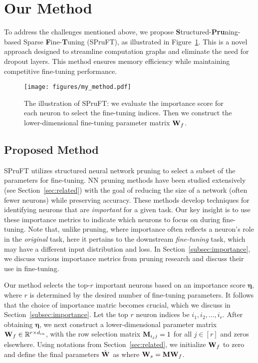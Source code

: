 \section{Our Method}\label{sec:method}

To address the challenges mentioned above, we propose \textbf{S}tructured-\textbf{Pru}ning-based Sparse \textbf{F}ine-\textbf{T}uning (SPruFT), as illustrated in Figure~\ref{fig:method}. This is a novel approach designed to streamline computation graphs and eliminate the need for dropout layers. This method ensures memory efficiency while maintaining competitive fine-tuning performance. 

\begin{figure}[htbp]
\begin{center}
\texttt{[image: figures/my\_method.pdf]}
\caption{The illustration of SPruFT: we evaluate the importance score for each neuron to select the fine-tuning indices. Then we construct the lower-dimensional fine-tuning parameter matrix ${\mathbf{W}}_f$.}\label{fig:method} %
\end{center}
\end{figure}
\unskip

\subsection{Proposed Method} \label{subsec:method}

SPruFT utilizes structured neural network pruning to select a subset of the parameters for fine-tuning. NN pruning methods have been studied extensively (see Section~\ref{sec:related}) with the goal of reducing the size of a network (often fewer neurons) while preserving accuracy. These methods develop techniques for identifying neurons that are \emph{important} for a given task. Our key insight is to use these importance metrics to indicate which neurons to focus on during fine-tuning. Note that, unlike pruning, where importance often reflects a neuron's role in the \emph{original} task, here it pertains to the downstream \emph{fine-tuning} task,  which may have a different input distribution and loss. In Section~\ref{subsec:importance}, we discuss various importance metrics from pruning research and discuss their use in fine-tuning. 

Our method selects the top-$r$ important neurons based on an importance score ${\bm \eta}$, where $r$ is determined by the desired number of fine-tuning parameters. It follows that the choice of importance matric becomes crucial, which we discuss in Section~\ref{subsec:importance}. Let the top $r$ neuron indices be $i_1, i_2, \dots, i_r$. After obtaining ${\bm \eta}$, we next construct a lower-dimensional parameter matrix ${\mathbf{W}}_f\in\mathbb{R}^{r\times d_{in}}$, with the row selection matrix ${\mathbf{M}}_{i_{j}j}=1$ for all $j \in [r]$ and zeros elsewhere. Using notations from Section~\ref{sec:related}, we initialize ${\mathbf{W}}_f$ to zero and  define the final parameters $\hat{{\mathbf{W}}}$ as  where ${\mathbf{W}}_s= {\mathbf{M}}{\mathbf{W}}_f$. 

